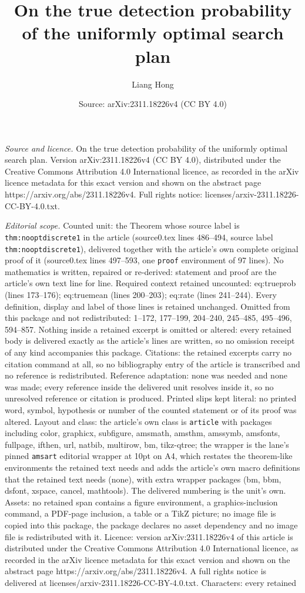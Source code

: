 \documentclass[10pt,a4paper]{amsart}
\title[On the true detection probability of the uniformly optimal s]{On the true detection probability of the uniformly optimal search plan}
\author{Liang Hong}
\date{Source: arXiv:2311.18226v4 (CC BY 4.0)}
\begin{document}
\maketitle

\noindent\emph{Source and licence.} On the true detection probability of the uniformly optimal search plan. Version arXiv:2311.18226v4 (CC BY 4.0), distributed under the Creative Commons Attribution 4.0 International licence, as recorded in the arXiv licence metadata for this exact version and shown on the abstract page https://arxiv.org/abs/2311.18226v4. Full rights notice: licenses/arxiv-2311.18226-CC-BY-4.0.txt.\par\smallskip

\noindent\textit{Editorial scope.} Counted unit: the Theorem whose source label is \texttt{thm:nooptdiscrete1} in the article (source0.tex lines 486--494, source label \texttt{thm:nooptdiscrete1}), delivered together with the article's own complete original proof of it (source0.tex lines 497--593, one \texttt{proof} environment of 97 lines). No mathematics is written, repaired or re-derived: statement and proof are the article's own text line for line. Required context retained uncounted: eq:trueprob (lines 173--176); eq:truemean (lines 200--203); eq:rate (lines 241--244). Every definition, display and label of those lines is retained unchanged. Omitted from this package and not redistributed: 1--172, 177--199, 204--240, 245--485, 495--496, 594--857. Nothing inside a retained excerpt is omitted or altered: every retained body is delivered exactly as the article's lines are written, so no omission receipt of any kind accompanies this package. Citations: the retained excerpts carry no citation command at all, so no bibliography entry of the article is transcribed and no reference is redistributed. Reference adaptation: none was needed and none was made; every reference inside the delivered unit resolves inside it, so no unresolved reference or citation is produced. Printed slips kept literal: no printed word, symbol, hypothesis or number of the counted statement or of its proof was altered. Layout and class: the article's own class is \texttt{article} with packages including color, graphicx, subfigure, amsmath, amsthm, amssymb, amsfonts, fullpage, ifthen, url, natbib, multirow, bm, tikz-qtree; the wrapper is the lane's pinned \texttt{amsart} editorial wrapper at 10pt on A4, which restates the theorem-like environments the retained text needs and adds the article's own macro definitions that the retained text needs (none), with extra wrapper packages (bm, bbm, dsfont, xspace, cancel, mathtools). The delivered numbering is the unit's own. Assets: no retained span contains a figure environment, a graphics-inclusion command, a PDF-page inclusion, a table or a TikZ picture; no image file is copied into this package, the package declares no asset dependency and no image file is redistributed with it. Licence: version arXiv:2311.18226v4 of this article is distributed under the Creative Commons Attribution 4.0 International licence, as recorded in the arXiv licence metadata for this exact version and shown on the abstract page https://arxiv.org/abs/2311.18226v4. A full rights notice is delivered at licenses/arxiv-2311.18226-CC-BY-4.0.txt. Characters: every retained 
\end{document}
